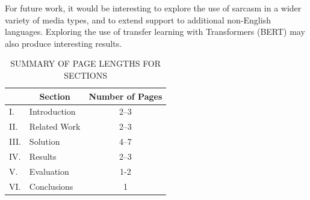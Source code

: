 \documentclass[12pt,a4paper]{article}
\begin{document}
For future work, it would be interesting to explore the use of sarcasm in a wider variety of media types, and to extend support to additional non-English languages. Exploring the use of transfer learning with Transformers (BERT) may also produce interesting results.




\begin{table}[htb]
\centering
\caption{SUMMARY OF PAGE LENGTHS FOR SECTIONS}
\vspace*{6pt}
\label{summary}
\begin{tabular}{|ll|c|} \hline
& \multicolumn{1}{c|}{\bf Section} & {\bf Number of Pages} \\ \hline
I. & Introduction & 2--3 \\ \hline
II. & Related Work & 2--3 \\ \hline
III. & Solution & 4--7 \\ \hline
IV. & Results & 2--3 \\ \hline
V. & Evaluation & 1-2 \\ \hline
VI. & Conclusions & 1 \\ \hline
\end{tabular}
\end{table}



\end{document}
